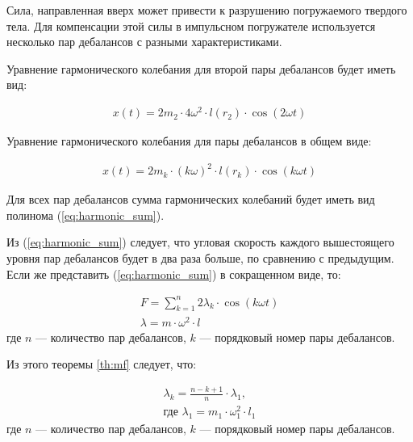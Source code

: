 Сила, направленная вверх может привести к разрушению погружаемого твердого тела.
Для компенсации этой силы в импульсном погружателе используется несколько пар дебалансов с разными характеристиками.

Уравнение гармонического колебания для второй пары дебалансов будет иметь вид:

\begin{equation*}
    \begin{aligned}
        x(t) = 2 m_2 \cdot 4 \omega^2 \cdot l(r_2) \cdot \cos (2 \omega t)
    \end{aligned}
\end{equation*}

Уравнение гармонического колебания для пары дебалансов в общем виде:

\begin{equation}\label{eq:harmonic_common}
    \begin{aligned}
        x(t) = 2 m_k \cdot (k \omega)^2 \cdot l(r_k) \cdot \cos (k \omega t)
    \end{aligned}
\end{equation}

Для всех пар дебалансов сумма гармонических колебаний будет иметь вид полинома (\ref{eq:harmonic_sum}).

Из (\ref{eq:harmonic_sum}) следует, что угловая скорость каждого вышестоящего уровня пар дебалансов будет в два раза больше, по сравнению с предыдущим.
Если же представить (\ref{eq:harmonic_sum}) в сокращенном виде, то:

\begin{equation}\label{eq:short_harmonic_sum}
    \begin{gathered}
        F = \sum\limits_{k = 1}^n 2 \lambda_k \cdot \cos (k \omega t) \\
        \lambda = m \cdot \omega^2 \cdot l
    \end{gathered}
\end{equation}
\noindent где $n$ --- количество пар дебалансов, $k$ --- порядковый номер пары дебалансов.

Из этого теоремы \ref{th:mf} следует, что:

\begin{equation}\label{eq:opt_attitude}
    \begin{gathered}
        \lambda_k = \frac{n - k + 1}{n} \cdot \lambda_1,\\
        \textrm{где } \lambda_1 = m_1 \cdot \omega_{1}^{2} \cdot l_1
    \end{gathered}
\end{equation}
\noindent где $n$ --- количество пар дебалансов, $k$ --- порядковый номер пары дебалансов.

